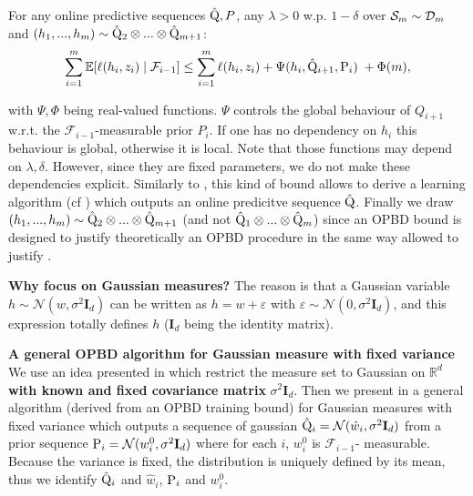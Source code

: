 For any online predictive sequences $\hat{\Q},P$, any $\lambda>0$ w.p. $1-\delta$ over $\Sm\sim\Dm$ and $(h_1,...,h_{m})\sim \hat{\Q}_2\otimes...\otimes \hat{\Q}_{m+1}$:
\begin{align}
  \label{eq: OPBD_train_bound}
  \sum_{i=1}^m  \mathbb{E}[\ell(h_i,z_i) \mid \mathcal{F}_{i-1}]   \leq \sum_{i=1}^m  \ell(h_i,z_i)  + \Psi(h_{i},\hat{\Q}_{i+1},\P_{i}) \; + \Phi(m),
\end{align}

with $\Psi,\Phi$ being real-valued functions. $\Psi$ controls the global behaviour of $Q_{i+1}$ w.r.t. the $\mathcal{F}_{i-1}$-measurable prior $P_{i}$. If one has no dependency on $h_i$ this behaviour is global, otherwise it is local.
Note that those functions may depend on $\lambda,\delta$. However, since they are fixed parameters, we do not make these dependencies explicit.
Similarly to , this kind of bound allows to derive a learning algorithm (cf ) which outputs an online predicitve sequence $\hat{\Q}$.
Finally we draw $(h_1,...,h_{m})\sim \hat{\Q}_2\otimes...\otimes \hat{\Q}_{m+1}$ (and not $\hat{\Q}_1\otimes...\otimes \hat{\Q}_{m}$)  since an OPBD bound is designed to justify theoretically an OPBD procedure in the same way  allowed to justify .


\textbf{Why focus on Gaussian measures?} The reason is that a Gaussian variable $h\sim\mathcal{N}(w,\sigma^2\mathbf{I}_d)$ can be written as $h=w +\varepsilon$ with $\varepsilon\sim\mathcal{N}(0,\sigma^2\mathbf{I}_d)$, and this expression totally defines $h$ ($\mathbf{I}_d$ being the identity matrix).

\textbf{A general OPBD algorithm for Gaussian measure with fixed variance} We use an idea presented in \citet{viallard2023general} which restrict the measure set to Gaussian on $\mathbb{R}^d$ \textbf{with known and fixed covariance matrix} $\sigma^2 \mathbf{I}_d$.
Then we present in  a general algorithm (derived from an OPBD training bound) for Gaussian measures with fixed variance which outputs a sequence of gaussian $\hat{\Q}_i=\mathcal{N}(\hat{w}_i,\sigma^2\mathbf{I}_d)$ from a prior sequence $\P_{i}= \mathcal{N}(w_i^0,\sigma^2\mathbf{I}_d)$
where for each $i$, $w_i^0$ is $\mathcal{F}_{i-1}$- measurable. Because the variance is fixed, the distribution is uniquely defined by its mean, thus we identify $\hat{\Q}_i$ and $\hat{w}_i$, $\P_{i}$ and $w_i^0$.

